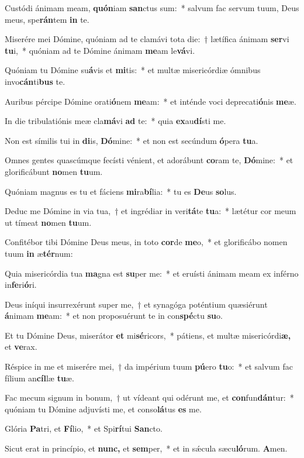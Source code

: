 \item Custódi ánimam meam, \textbf{quón}iam \textbf{san}ctus sum:~* salvum fac servum tuum, Deus meus, spe\textbf{rán}tem \textbf{in} te.
\item Miserére mei Dómine, quóniam ad te clamávi tota die:~† lætífica ánimam \textbf{ser}vi \textbf{tu}i,~* quóniam ad te Dómine ánimam \textbf{me}am le\textbf{vá}vi.
\item Quóniam tu Dómine su\textbf{á}vis et \textbf{mi}tis:~* et multæ misericórdiæ ómnibus invo\textbf{cán}ti\textbf{bus} te.
\item Auribus pércipe Dómine orati\textbf{ó}nem \textbf{me}am:~* et inténde voci deprecati\textbf{ó}nis \textbf{me}æ.
\item In die tribulatiónis meæ cla\textbf{má}vi \textbf{ad} te:~* quia \textbf{ex}au\textbf{dí}sti me.
\item Non est símilis tui in \textbf{di}is, \textbf{Dó}mine:~* et non est secúndum \textbf{ó}pera \textbf{tu}a.
\item Omnes gentes quascúmque fecísti vénient, et adorábunt \textbf{co}ram te, \textbf{Dó}mine:~* et glorificábunt \textbf{no}men \textbf{tu}um.
\item Quóniam magnus es tu et fáciens \textbf{mi}ra\textbf{bí}lia:~* tu es \textbf{De}us \textbf{so}lus.
\item Deduc me Dómine in via tua,~† et ingrédiar in veri\textbf{tá}te \textbf{tu}a:~* lætétur cor meum ut tímeat \textbf{no}men \textbf{tu}um.
\item Confitébor tibi Dómine Deus meus, in toto \textbf{cor}de \textbf{me}o,~* et glorificábo nomen tuum \textbf{in} æ\textbf{tér}num:
\item Quia misericórdia tua \textbf{ma}gna est \textbf{su}per me:~* et eruí\-sti ánimam meam ex inférno in\textbf{fe}ri\textbf{ó}ri.
\item Deus iníqui insurrexérunt super me,~† et synagóga poténtium quæsiérunt \textbf{á}nimam \textbf{me}am:~* et non proposuérunt te in con\textbf{spé}ctu \textbf{su}o.
\item Et tu Dómine Deus, miserátor \textbf{et} mi\textbf{sé}ricors,~* pátiens, et multæ misericórdi\textbf{æ,} et \textbf{ve}rax.
\item Réspice in me et miserére mei,~† da impérium tuum \textbf{pú}ero \textbf{tu}o:~* et salvum fac fílium an\textbf{cíl}læ \textbf{tu}æ.
\item Fac mecum signum in bonum,~† ut vídeant qui odérunt me, et \textbf{con}fun\textbf{dán}tur:~* quóniam tu Dómine adjuvísti me, et conso\textbf{lá}tus \textbf{es} me.
\item Glória \textbf{Pa}tri, et \textbf{Fí}lio,~* et Spi\textbf{rí}tui \textbf{San}cto.
\item Sicut erat in princípio, et \textbf{nunc,} et \textbf{sem}per,~* et in sǽcula sæcu\textbf{ló}rum. \textbf{A}men.
